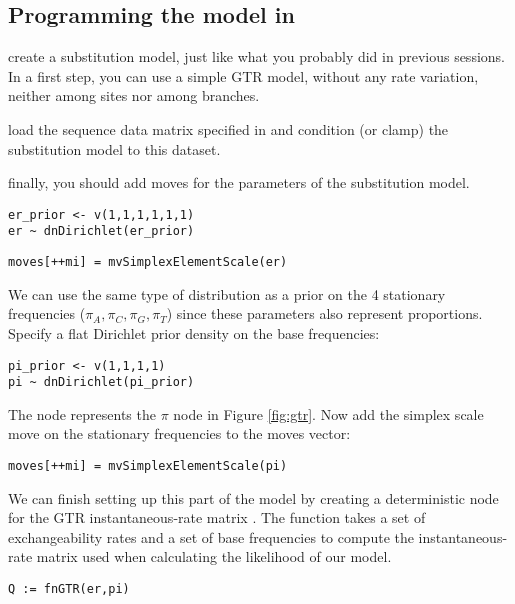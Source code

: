 \subsection{Programming the model in \RevBayes}

create a substitution model, just like what you probably did in previous sessions. In a first step, you can use a simple GTR model, without any rate variation, neither among sites nor among branches.

load the sequence data matrix specified in  and condition (or clamp) the substitution model to this dataset.

finally, you should add moves for the parameters of the substitution model.

{\tt \begin{snugshade*}
\begin{lstlisting}
er_prior <- v(1,1,1,1,1,1) 
er ~ dnDirichlet(er_prior)
\end{lstlisting}
\end{snugshade*}}

{\tt\small \begin{snugshade*}
\begin{lstlisting}
moves[++mi] = mvSimplexElementScale(er) 
\end{lstlisting}
\end{snugshade*}}

We can use the same type of distribution as a prior on the 4 stationary frequencies ($\pi_A, \pi_C, \pi_G, \pi_T$) since these parameters also represent proportions. 
Specify a flat Dirichlet prior density on the base frequencies:
{\tt \begin{snugshade*}
\begin{lstlisting}
pi_prior <- v(1,1,1,1) 
pi ~ dnDirichlet(pi_prior)
\end{lstlisting}
\end{snugshade*}}

The node  represents the $\pi$ node in Figure \ref{fig:gtr}.
Now add the simplex scale move on the stationary frequencies to the moves vector:
{\tt \small \begin{snugshade*}
\begin{lstlisting}
moves[++mi] = mvSimplexElementScale(pi)  
\end{lstlisting}
\end{snugshade*}}

We can finish setting up this part of the model by creating a deterministic node for the GTR instantaneous-rate matrix . 
The  function takes a set of exchangeability rates and a set of base frequencies to compute the instantaneous-rate matrix used when calculating the likelihood of our model.
{\tt \begin{snugshade*}
\begin{lstlisting}
Q := fnGTR(er,pi)
\end{lstlisting}
\end{snugshade*}}

